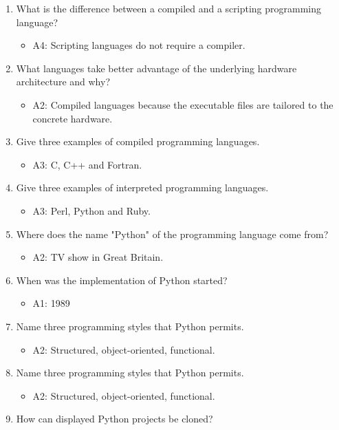 \documentclass[article,A4,12pt]{llncs}
\begin{document}
\begin{enumerate}
\item What is the difference between a compiled and a scripting programming language?
  \begin{itemize}
    \item A4: Scripting languages do not require a compiler.
  \end{itemize}
\item What languages take better advantage of the underlying hardware architecture
      and why?
  \begin{itemize}
    \item A2: Compiled languages because the executable files are tailored 
          to the concrete hardware.
  \end{itemize}
\item Give three examples of compiled programming languages.
  \begin{itemize}
    \item A3: C, C++ and Fortran.
  \end{itemize}
\item Give three examples of interpreted programming languages.
  \begin{itemize}
    \item A3: Perl, Python and Ruby. 
  \end{itemize}
\item Where does the name "Python" of the programming language come from?
  \begin{itemize}
    \item A2: TV show in Great Britain.
  \end{itemize}
\item When was the implementation of Python started?
  \begin{itemize}
    \item A1: 1989
  \end{itemize}
\item Name three programming styles that Python permits.
  \begin{itemize}
    \item A2: Structured, object-oriented, functional.
  \end{itemize}
\item Name three programming styles that Python permits.
  \begin{itemize}
    \item A2: Structured, object-oriented, functional.
  \end{itemize}
\item How can displayed Python projects be cloned?

\end{enumerate}
\end{document}
